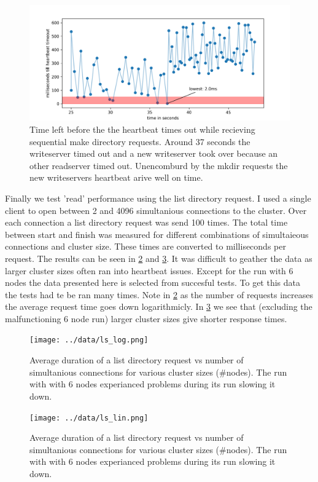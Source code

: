 \begin{figure}[htbp]
	\centering
	\includegraphics{../data/hb_timeout.png}
	\caption{Time left before the the heartbeat times out while recieving sequential make directory requests. Around 37 seconds the writeserver timed out and a new writeserver took over because an other readserver timed out. Unencomburd by the mkdir requests the new writeservers heartbeat arive well on time.}
	\label{fig:hbt}
\end{figure}

Finally we test 'read' performance using the list directory request. I used a single client to open between 2 and 4096 simultanious connections to the cluster. Over each connection a list directory request was send 100 times. The total time between start and finish was measured for different combinations of simultaieous connections and cluster size. These times are converted to milliseconds per request. The results can be seen in \cref{fig:ls_log} and \cref{fig:ls_lin}. 
It was difficult to geather the data as larger cluster sizes often ran into heartbeat issues. Except for the run with 6 nodes the data presented here is selected from succesful tests. To get this data the tests had te be ran many times.
Note in \cref{fig:ls_log} as the number of requests increases the average request time goes down logarithmicly. In \cref{fig:ls_lin} we see that (excluding the malfunctioning 6 node run) larger cluster sizes give shorter response times.

\begin{figure}[htbp]
	\centering
	\texttt{[image: ../data/ls\_log.png]}
	\caption{Average duration of a list directory request vs number of simultanious connections for various cluster sizes (\#nodes). The run with with 6 nodes experianced problems during its run slowing it down.}
	\label{fig:ls_log}
\end{figure}

\begin{figure}[htbp]
	\centering
	\texttt{[image: ../data/ls\_lin.png]}
	\caption{Average duration of a list directory request vs number of simultanious connections for various cluster sizes (\#nodes). The run with with 6 nodes experianced problems during its run slowing it down.}
	\label{fig:ls_lin}
\end{figure}
